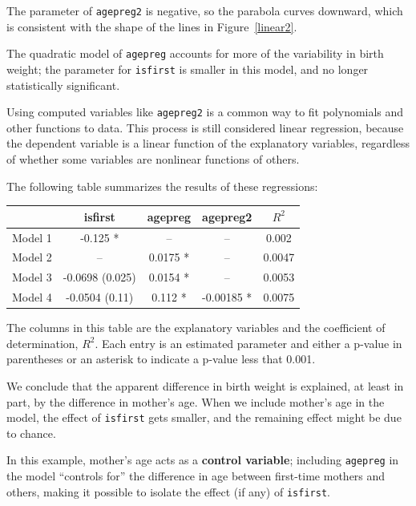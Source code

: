 \documentclass[12pt]{book}
\begin{document}
The parameter of {\tt agepreg2} is negative, so the parabola
curves downward, which is consistent with the shape of the lines
in Figure~\ref{linear2}.

The quadratic model of {\tt agepreg} accounts for more of the
variability in birth weight; the parameter for {\tt isfirst}
is smaller in this model, and no longer statistically significant.
   

Using computed variables like {\tt agepreg2} is a common way to
fit polynomials and other functions to data.  
This process is still considered linear
regression, because the dependent variable is a linear function of
the explanatory variables, regardless of whether some variables
are nonlinear functions of others.

The following table summarizes the results of these regressions:

\begin{center}
\begin{tabular}{|l|c|c|c|c|}
\hline & isfirst & agepreg & agepreg2 & $R^2$ \\ \hline
Model 1 & -0.125 * & -- & -- & 0.002 \\
Model 2 & -- & 0.0175 * & -- & 0.0047 \\
Model 3 & -0.0698 (0.025) & 0.0154 * & -- & 0.0053 \\
Model 4 & -0.0504 (0.11) & 0.112 * & -0.00185 * & 0.0075 \\
\hline
\end{tabular}
\end{center}

The columns in this table are the explanatory variables and
the coefficient of determination, $R^2$.  Each entry is an estimated
parameter and either a p-value in parentheses or an asterisk to
indicate a p-value less that 0.001.

We conclude that the apparent difference in birth weight
is explained, at least in part, by the difference in mother's age.
When we include mother's age in the model, the effect of
{\tt isfirst} gets smaller, and the remaining effect might be
due to chance.

In this example, mother's age acts as a {\bf control variable};
including {\tt agepreg} in the model ``controls for'' the
difference in age between first-time mothers and others, making
it possible to isolate the effect (if any) of {\tt isfirst}. 
\end{document}
